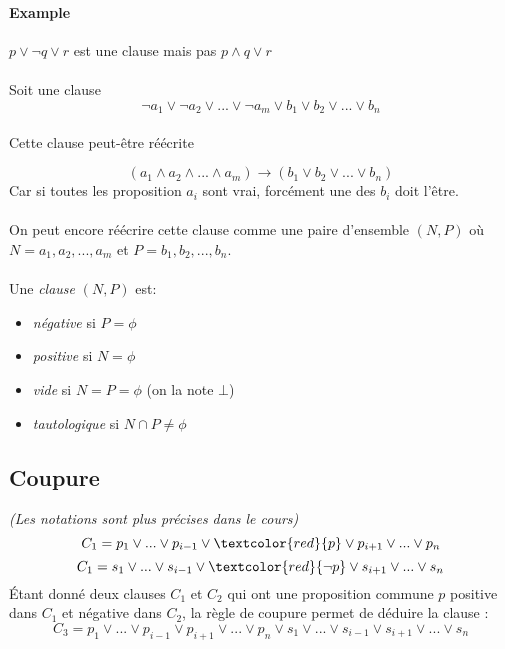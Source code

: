 \documentclass[a4paper]{article}
\begin{document}
  \paragraph{Example} $p \vee \neg q \vee r$ est une clause mais pas $p \wedge q \vee r$
  \paragraph{}
  Soit une clause 
  $$ \neg a_1 \vee \neg a_2 \vee ... \vee \neg a_m \vee b_1 \vee b_2 \vee ... \vee b_n$$
  \paragraph{}
  Cette clause peut-être réécrite
  
  $$( a_1 \wedge a_2 \wedge ... \wedge a_m ) \longrightarrow (  b_1 \vee b_2 \vee ... \vee b_n)$$
  Car si toutes les proposition $a_i$ sont vrai, forcément une des $b_i$ doit l'être.
  
  \paragraph{}
  On peut encore réécrire cette clause comme une paire d'ensemble $(N, P)$ où  $N = {a_1, a_2, ..., a_m}$ et $P = {b_1, b_2, ..., b_n}$.
  
  \paragraph{}
  Une \emph{clause} $(N, P)$ est:
  \begin{itemize}
   \item{\emph{négative} si $P = \phi$} 
   \item{\emph{positive} si $N = \phi$} 
   \item{\emph{vide} si $N = P = \phi$ (on la note $\bot$)} 
   \item{\emph{tautologique} si $ N \cap P \neq \phi$} 
  \end{itemize}

  

  \subsection{Coupure}
  \textit{(Les notations sont plus précises dans le cours)}\\
  $$ C_1 = p_1 \lor ... \lor p_{i-1} \lor \textcolor{red}{p} \lor p_{i+1} \lor ... \lor p_n$$
  $$ C_1 = s_1 \lor ... \lor s_{i-1} \lor \textcolor{red}{\lnot p} \lor s_{i+1} \lor ... \lor s_n$$
  \'Etant donné deux clauses $C_1$ et $C_2$ qui ont une proposition commune $p$
  positive dans $C_1$ et négative dans $C_2$, la règle de coupure permet de déduire
  la clause : 
  $$ C_3 = p_1 \lor ... \lor p_{i-1} \lor p_{i+1} \lor ... \lor p_n
     \lor s_1 \lor ... \lor s_{i-1} \lor s_{i+1} \lor ... \lor s_n$$
\end{document}
